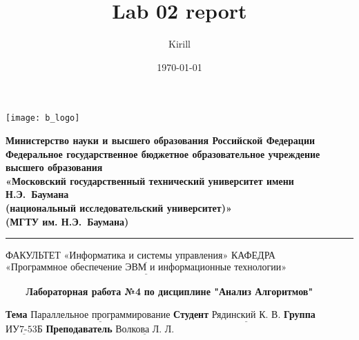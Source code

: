 

\title{Lab 02 report}
\author{Kirill}

\date{\today}


\thispagestyle{empty}

\noindent \begin{minipage}{0.15\textwidth}
	\texttt{[image: b\_logo]}
\end{minipage}
\noindent\begin{minipage}{0.85\textwidth}\centering
	\textbf{Министерство науки и высшего образования Российской Федерации}\\
	\textbf{Федеральное государственное бюджетное образовательное учреждение высшего образования}\\
	\textbf{«Московский государственный технический университет имени Н.Э.~Баумана}\\
	\textbf{(национальный исследовательский университет)»}\\
	\textbf{(МГТУ им. Н.Э.~Баумана)}
\end{minipage}

\noindent\rule{16cm}{3pt}
\newline\newline
\noindent ФАКУЛЬТЕТ $\underline{\text{«Информатика и системы управления»}}$ \newline\newline
\noindent КАФЕДРА $\underline{\text{«Программное обеспечение ЭВМ и информационные технологии»}}$\newline


\begin{center}
	\noindent\begin{minipage}{1.3\textwidth}\centering
	\Large\textbf{   ~~~ Лабораторная работа №4}\newline
	\textbf{по дисциплине "Анализ Алгоритмов"}\newline\newline\newline
	\end{minipage}
\end{center}

\noindent\textbf{Тема} $\underline{\text{Параллельное программирование}}$\newline\newline
\noindent\textbf{Студент} $\underline{\text{Рядинский К. В.}}$\newline\newline
\noindent\textbf{Группа} $\underline{\text{ИУ7-53Б}}$\newline\newline
\noindent\textbf{Преподаватель} $\underline{\text{Волкова Л. Л.}}$\newline


